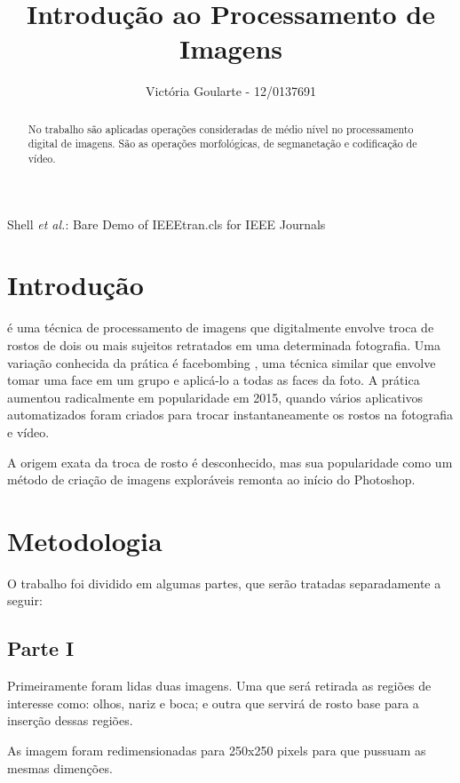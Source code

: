 \documentclass[journal]{IEEEtran}
\begin{document}
\title{Introdução ao Processamento de Imagens}

\author{Victória Goularte - 12/0137691}

{Shell \MakeLowercase{\textit{et al.}}: Bare Demo of IEEEtran.cls for IEEE Journals}

\maketitle

\begin{abstract}
No trabalho são aplicadas operações consideradas de médio nível no processamento digital de imagens. São as operações morfológicas, de segmanetação e codificação de vídeo.
\end{abstract}

\section{Introdução}

 é uma técnica de processamento de imagens que digitalmente envolve troca de rostos de dois ou mais sujeitos retratados em uma determinada fotografia. Uma variação conhecida da prática é facebombing , uma técnica similar que envolve tomar uma face em um grupo e aplicá-lo a todas as faces da foto. A prática aumentou radicalmente em popularidade em 2015, quando vários aplicativos automatizados foram criados para trocar instantaneamente os rostos na fotografia e vídeo.


	A origem exata da troca de rosto é desconhecido, mas sua popularidade como um método de criação de imagens exploráveis ​​remonta ao início do Photoshop. 


\section{Metodologia}
O trabalho foi dividido em algumas partes, que serão tratadas separadamente a seguir:\newline

\subsection*{Parte I}
Primeiramente foram lidas duas imagens. Uma que será retirada as regiões de interesse como: olhos, nariz e boca; e outra que servirá de rosto base para a inserção dessas regiões.

As imagem foram redimensionadas para 250x250 pixels para que pussuam as mesmas dimenções.
\end{document}
